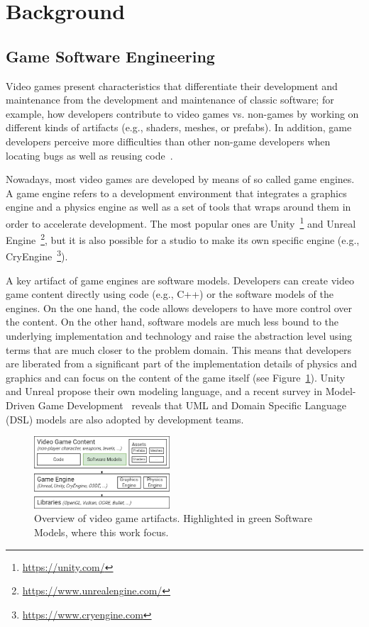 \section{Background} \label{sec:Background}

\subsection{Game Software Engineering}
Video games present characteristics that differentiate their development
and maintenance from the development and maintenance
of classic software; for example, how developers contribute to video
games vs. non-games by working on different kinds of artifacts (e.g.,
shaders, meshes, or prefabs). In addition, game developers perceive
more difficulties than other non-game developers when locating
bugs as well as reusing code~\cite{pascarella2018video}.

Nowadays, most video games are developed by means of so called game engines. A game engine refers to a development environment that integrates a graphics engine and a physics engine as well as a set of tools that wraps around them in order to accelerate development. The most popular ones are Unity~\footnote{\url{https://unity.com/}} and Unreal Engine~\footnote{\url{https://www.unrealengine.com/}}, but it is also possible for a studio to make its own specific engine (e.g., CryEngine~\footnote{\url{https://www.cryengine.com}}).

A key artifact of game engines are software models. Developers can create video game content directly using code (e.g., C++) or the software models of the engines. On the one hand, the code allows developers to have more control over the content. On the other hand, software models are much less bound to the underlying implementation and technology and raise the abstraction level using terms that are much closer to the problem domain. This means that developers are liberated from a significant part of the implementation details of physics and graphics and can focus on the content of the game itself (see Figure~\ref{fig:architecture}). Unity and Unreal propose their own modeling language, and a recent survey in Model-Driven Game Development~\cite{zhu2019model} reveals that UML and Domain Specific Language (DSL) models are also adopted by development teams.

\begin{figure}[h]
    \centering
    \includegraphics[width=0.45\textwidth]{Figures/ArchitectureLayers.drawio.png}
    \caption{Overview of video game artifacts. Highlighted in green Software Models, where this work focus.}
    \label{fig:architecture}
\end{figure}

